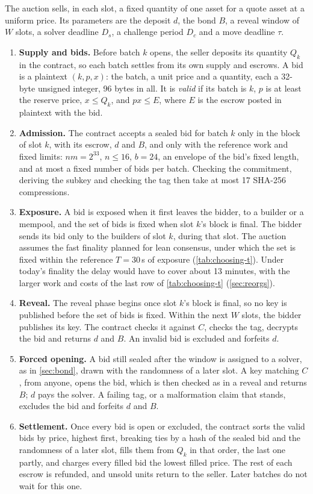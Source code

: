 The auction sells, in each slot, a fixed quantity of one asset for a quote asset at a uniform price. Its parameters are the deposit $d$, the bond $B$, a reveal window of $W$ slots, a solver deadline $D_s$, a challenge period $D_c$ and a move deadline $\tau$.
\begin{enumerate}[leftmargin=1.5em]
  \item \textbf{Supply and bids.} Before batch $k$ opens, the seller deposits its quantity $Q_k$ in the contract, so each batch settles from its own supply and escrows. A bid is a plaintext $(k, p, x)$: the batch, a unit price and a quantity, each a 32-byte unsigned integer, 96 bytes in all. It is \emph{valid} if its batch is $k$, $p$ is at least the reserve price, $x \le Q_k$, and $p x \le E$, where $E$ is the escrow posted in plaintext with the bid.
  \item \textbf{Admission.} The contract accepts a sealed bid for batch $k$ only in the block of slot $k$, with its escrow, $d$ and $B$, and only with the reference work and fixed limits: $nm = 2^{33}$, $n \le 16$, $b = 24$, an envelope of the bid's fixed length, and at most a fixed number of bids per batch. Checking the commitment, deriving the subkey and checking the tag then take at most 17 SHA-256 compressions.
  \item \textbf{Exposure.} A bid is exposed when it first leaves the bidder, to a builder or a mempool, and the set of bids is fixed when slot $k$'s block is final. The bidder sends its bid only to the builders of slot $k$, during that slot. The auction assumes the fast finality planned for lean consensus, under which the set is fixed within the reference $T = 30$\,s of exposure (\cref{tab:choosing-t}). Under today's finality the delay would have to cover about 13 minutes, with the larger work and costs of the last row of \cref{tab:choosing-t} (\cref{sec:reorgs}).
  \item \textbf{Reveal.} The reveal phase begins once slot $k$'s block is final, so no key is published before the set of bids is fixed. Within the next $W$ slots, the bidder publishes its key. The contract checks it against $C$, checks the tag, decrypts the bid and returns $d$ and $B$. An invalid bid is excluded and forfeits $d$.
  \item \textbf{Forced opening.} A bid still sealed after the window is assigned to a solver, as in \cref{sec:bond}, drawn with the randomness of a later slot. A key matching $C$, from anyone, opens the bid, which is then checked as in a reveal and returns $B$; $d$ pays the solver. A failing tag, or a malformation claim that stands, excludes the bid and forfeits $d$ and $B$.
  \item \textbf{Settlement.} Once every bid is open or excluded, the contract sorts the valid bids by price, highest first, breaking ties by a hash of the sealed bid and the randomness of a later slot, fills them from $Q_k$ in that order, the last one partly, and charges every filled bid the lowest filled price. The rest of each escrow is refunded, and unsold units return to the seller. Later batches do not wait for this one.
\end{enumerate}

